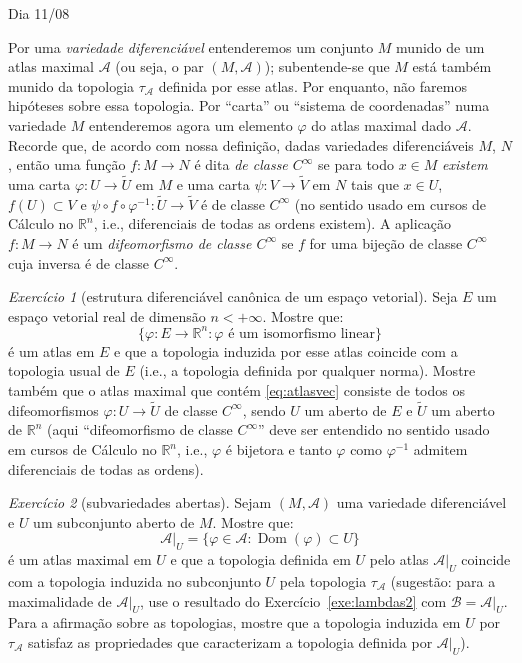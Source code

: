 \documentclass[oneside,11pt]{amsart}
\newcommand{\R}{\mathds R}
\DeclareMathOperator{\Dom}{Dom}
\theoremstyle{remark}\newtheorem{exercise}{Exercício}[section]
\theoremstyle{plain}\newtheorem{teo}{Teorema}[section]
\theoremstyle{plain}\newtheorem{lem}[teo]{Lema}
\theoremstyle{plain}\newtheorem{prop}[teo]{Proposição}
\theoremstyle{definition}\newtheorem{defin}[teo]{Definição}
\theoremstyle{remark}\newtheorem{rem}[teo]{Observação}
\theoremstyle{definition}\newtheorem{example}[teo]{Exemplo}
\numberwithin{equation}{section}
\begin{document}
\begin{section}{Dia 11/08}

Por uma {\em variedade diferenciável\/} entenderemos um conjunto $M$ munido de um atlas maximal $\mathcal A$ (ou seja,
o par $(M,\mathcal A)$); subentende-se que $M$ está também munido da topologia $\tau_{\mathcal A}$ definida por esse atlas.
Por enquanto, não faremos hipóteses sobre essa topologia. Por ``carta'' ou ``sistema de coordenadas'' numa variedade $M$ entenderemos agora
um elemento $\varphi$ do atlas maximal dado $\mathcal A$. Recorde que, de acordo com nossa definição, dadas variedades diferenciáveis $M$, $N$, então
uma função $f:M\to N$ é dita {\em de classe $C^\infty$\/} se para todo $x\in M$ {\em existem\/} uma carta $\varphi:U\to\widetilde U$ em $M$ e uma carta
$\psi:V\to\widetilde V$ em $N$ tais que $x\in U$, $f(U)\subset V$ e $\psi\circ f\circ\varphi^{-1}:\widetilde U\to\widetilde V$ é de classe $C^\infty$
(no sentido usado em cursos de Cálculo no $\R^n$, i.e., diferenciais de todas as ordens existem).
A aplicação $f:M\to N$ é um {\em difeomorfismo de classe $C^\infty$\/} se $f$ for uma bijeção de classe $C^\infty$ cuja inversa é de classe $C^\infty$.

\begin{exercise}[estrutura diferenciável canônica de um espaço vetorial]\label{exe:varespvet}
Seja $E$ um espaço vetorial real de dimensão $n<+\infty$. Mostre que:
\begin{equation}\label{eq:atlasvec}
\big\{\varphi:E\to\R^n:\text{$\varphi$ é um isomorfismo linear}\big\}
\end{equation}
é um atlas em $E$ e que a topologia induzida por esse atlas coincide com a topologia usual de $E$ (i.e., a topologia
definida por qualquer norma). Mostre também que o atlas maximal que contém \eqref{eq:atlasvec} consiste de todos os difeomorfismos
$\varphi:U\to\widetilde U$ de classe $C^\infty$, sendo $U$ um aberto de $E$ e $\widetilde U$ um aberto de $\R^n$ (aqui ``difeomorfismo de classe $C^\infty$''
deve ser entendido no sentido usado em cursos de Cálculo no $\R^n$, i.e.,
$\varphi$ é bijetora e tanto $\varphi$ como $\varphi^{-1}$ admitem diferenciais de todas as ordens).
\end{exercise}

\begin{exercise}[subvariedades abertas]\label{exe:subvaraberta}
Sejam $(M,\mathcal A)$ uma variedade diferenciável e $U$ um subconjunto aberto de $M$. Mostre que:
\[\mathcal A\vert_U=\big\{\varphi\in\mathcal A:\Dom(\varphi)\subset U\big\}\]
é um atlas maximal em $U$ e que a topologia definida em $U$ pelo atlas $\mathcal A\vert_U$ coincide com a topologia
induzida no subconjunto $U$ pela topologia $\tau_{\mathcal A}$ (sugestão: para a maximalidade de $\mathcal A\vert_U$, use o resultado do Exercício~\ref{exe:lambdas2}
com $\mathcal B=\mathcal A\vert_U$. Para a afirmação sobre as topologias,
mostre que a topologia induzida em $U$ por $\tau_{\mathcal A}$ satisfaz as propriedades que caracterizam
a topologia definida por $\mathcal A\vert_U$).
\end{exercise}


\end{section}
\end{document}
